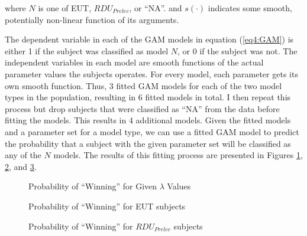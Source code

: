 \documentclass[../main.tex]{subfiles}
\begin{document}
\noindent where $N$ is one of EUT, $\mathit{RDU_{Prelec}}$, or \enquote{NA}. and $s(\cdot)$ indicates some smooth, potentially non-linear function of its arguments.

The dependent variable in each of the GAM models in equation (\ref{eq4:GAM}) is either 1 if the subject was classified as model $N$, or 0 if the subject was not.
The independent variables in each model are smooth functions of the actual parameter values the subjects operates.
For every model, each parameter gets its own smooth function.
Thus, 3 fitted GAM models for each of the two model types in the population, resulting in 6 fitted models in total.
I then repeat this process but drop subjects that were classified as \enquote{NA} from the data before fitting the models.
This results in 4 additional models.
Given the fitted models and a parameter set for a model type, we can use a fitted GAM model to predict the probability that a subject with the given parameter set will be classified as any of the $N$ models.
The results of this fitting process are presented in Figures \ref{fig:HNG1_win_mu}, \ref{fig:HNG1_win_eut}, and \ref{fig:HNG1_win_pre}.

\begin{figure}[hp!]
	\center
	\caption{Probability of \enquote{Winning} for Given $\lambda$ Values}
	\label{fig:HNG1_win_mu}
\end{figure}

\begin{figure}[hp!]
	\center
	\caption{Probability of \enquote{Winning} for EUT subjects}
	\label{fig:HNG1_win_eut}
\end{figure}

\begin{figure}[hp!]
	\center
	\caption{Probability of \enquote{Winning} for $\mathit{RDU_{Prelec}}$ subjects}
	\label{fig:HNG1_win_pre}
\end{figure}
\end{document}
